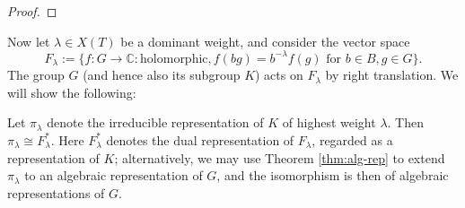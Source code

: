 \documentclass[reqno]{amsart} 
\begin{document}
\begin{proof}
\end{proof}

Now let $\lambda \in X(T)$ be a dominant weight, and consider the vector space
\begin{equation*}
  F_\lambda := \{f : G \rightarrow \mathbb{C} :
  \text{holomorphic},
  f(b g) = b^{-\lambda} f(g) \text{ for } b \in B, g \in G
  \}.
\end{equation*}
The group $G$ (and hence also its subgroup $K$) acts on $F_\lambda$ by right translation.  We will show the following:
\begin{theorem}\label{thm:borel-weil-construction}
  Let $\pi_\lambda$ denote the irreducible representation of $K$ of highest weight $\lambda$.  Then $\pi_\lambda \cong F_\lambda^*$.  Here $F_\lambda^*$ denotes the dual representation of $F_\lambda$, regarded as a representation of $K$; alternatively, we may use Theorem \ref{thm:alg-rep} to extend $\pi_\lambda$ to an algebraic representation of $G$, and the isomorphism is then of algebraic representations of $G$.
\end{theorem}
\end{document}
